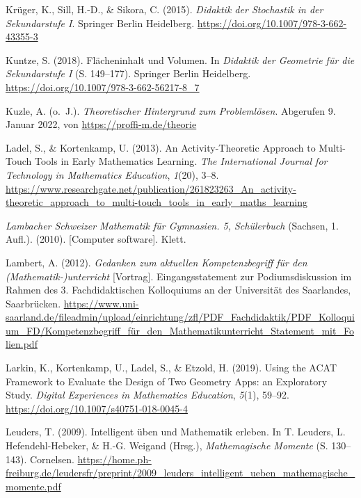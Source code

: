 \documentclass[
]{scrbook}
\newlength{\cslhangindent}
\newlength{\cslentryspacingunit} %
\newenvironment{CSLReferences}[2] %
 {%
  \setlength{\parindent}{0pt}
  \ifodd #1
  \let\oldpar\par
  \def\par{\hangindent=\cslhangindent\oldpar}
  \fi
  \setlength{\parskip}{#2\cslentryspacingunit}
 }%
 {}
\theoremstyle{definition}
\theoremstyle{definition}
\theoremstyle{definition}
\theoremstyle{definition}
\theoremstyle{remark}
\begin{document}
\begin{CSLReferences}{1}{0}
\leavevmode{}%
Krüger, K., Sill, H.-D., \& Sikora, C. (2015). \emph{Didaktik der {Stochastik} in der {Sekundarstufe} {I}}. Springer Berlin Heidelberg. \url{https://doi.org/10.1007/978-3-662-43355-3}

\leavevmode{}%
Kuntze, S. (2018). Flächeninhalt und {Volumen}. In \emph{Didaktik der {Geometrie} für die {Sekundarstufe} {I}} (S. 149--177). Springer Berlin Heidelberg. \url{https://doi.org/10.1007/978-3-662-56217-8_7}

\leavevmode{}%
Kuzle, A. (o.~J.). \emph{Theoretischer {Hintergrund} zum {Problemlösen}}. Abgerufen 9. Januar 2022, von \url{https://proffi-m.de/theorie}

\leavevmode{}%
Ladel, S., \& Kortenkamp, U. (2013). An {Activity}-{Theoretic} {Approach} to {Multi}-{Touch} {Tools} in {Early} {Mathematics} {Learning}. \emph{The International Journal for Technology in Mathematics Education}, \emph{1}(20), 3--8. \url{https://www.researchgate.net/publication/261823263_An_activity-theoretic_approach_to_multi-touch_tools_in_early_maths_learning}

\leavevmode{}%
\emph{Lambacher Schweizer Mathematik für Gymnasien. 5, Schülerbuch} (Sachsen, 1. Aufl.). (2010). {[}Computer software{]}. Klett.

\leavevmode{}%
Lambert, A. (2012). \emph{Gedanken zum aktuellen {Kompetenzbegriff} für den ({Mathematik}-)unterricht} {[}Vortrag{]}. Eingangsstatement zur Podiumsdiskussion im Rahmen des 3. Fachdidaktischen Kolloquiums an der Universität des Saarlandes, Saarbrücken. \url{https://www.uni-saarland.de/fileadmin/upload/einrichtung/zfl/PDF_Fachdidaktik/PDF_Kolloquium_FD/Kompetenzbegriff_für_den_Mathematikunterricht_Statement_mit_Folien.pdf}

\leavevmode{}%
Larkin, K., Kortenkamp, U., Ladel, S., \& Etzold, H. (2019). Using the {ACAT} {Framework} to {Evaluate} the {Design} of {Two} {Geometry} {Apps}: an {Exploratory} {Study}. \emph{Digital Experiences in Mathematics Education}, \emph{5}(1), 59--92. \url{https://doi.org/10.1007/s40751-018-0045-4}

\leavevmode{}%
Leuders, T. (2009). Intelligent üben und {Mathematik} erleben. In T. Leuders, L. Hefendehl-Hebeker, \& H.-G. Weigand (Hrsg.), \emph{Mathemagische {Momente}} (S. 130--143). Cornelsen. \url{https://home.ph-freiburg.de/leudersfr/preprint/2009_leuders_intelligent_ueben_mathemagische_momente.pdf}


\end{CSLReferences}
\end{document}
